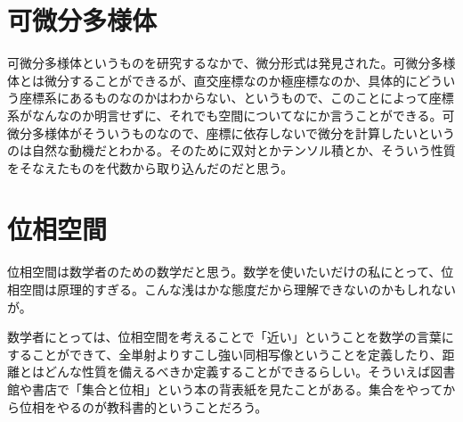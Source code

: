 \section{可微分多様体}

可微分多様体というものを研究するなかで、微分形式は発見された。可微分多様体とは微分することができるが、直交座標なのか極座標なのか、具体的にどういう座標系にあるものなのかはわからない、というもので、このことによって座標系がなんなのか明言せずに、それでも空間についてなにか言うことができる。可微分多様体がそういうものなので、座標に依存しないで微分を計算したいというのは自然な動機だとわかる。そのために双対とかテンソル積とか、そういう性質をそなえたものを代数から取り込んだのだと思う。

\newpage


\section{位相空間}

位相空間は数学者のための数学だと思う。数学を使いたいだけの私にとって、位相空間は原理的すぎる。こんな浅はかな態度だから理解できないのかもしれないが。

数学者にとっては、位相空間を考えることで「近い」ということを数学の言葉にすることができて、全単射よりすこし強い同相写像ということを定義したり、距離とはどんな性質を備えるべきか定義することができるらしい。そういえば図書館や書店で「集合と位相」という本の背表紙を見たことがある。集合をやってから位相をやるのが教科書的ということだろう。

\newpage

\newpage

